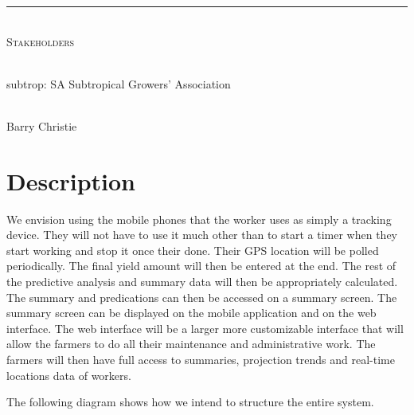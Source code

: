 \documentclass[12pt]{article}
\begin{document}
\begin{titlepage}
\begin{center}
		\rule{\linewidth}{0.5mm} \\[1cm] 
		\textsc{\Large Stakeholders}\\[1cm]	
		
		\begin{minipage}{0.4\textwidth}
			\begin{flushleft} \large
				\emph{} \\
				subtrop: SA Subtropical Growers' Association
			\end{flushleft}
		\end{minipage}
		\begin{minipage}{0.4\textwidth}
			\begin{flushright} \large
				\emph{} \\
				Barry Christie
			\end{flushright}
		\end{minipage}

		
	\end{center}
\end{titlepage}
	
    \newpage
	\tableofcontents
	\newpage
	
	\section{Description}
	We envision using the mobile phones that the worker uses as simply a tracking device. They will not have to use it much other than to start a timer when they start working and stop it once their done. Their GPS location will be polled periodically. The final yield amount will then be entered at the end. The rest of the predictive analysis and summary data will then be appropriately calculated. The summary and predications can then be accessed on a summary screen. The summary screen can be displayed on the mobile application and on the web interface. The web interface will be a larger more customizable interface that will allow the farmers to do all their maintenance and administrative work. The farmers will then have full access to summaries, projection trends and real-time locations data of workers.
	
	The following diagram shows how we intend to structure the entire system.
	
\end{document}
